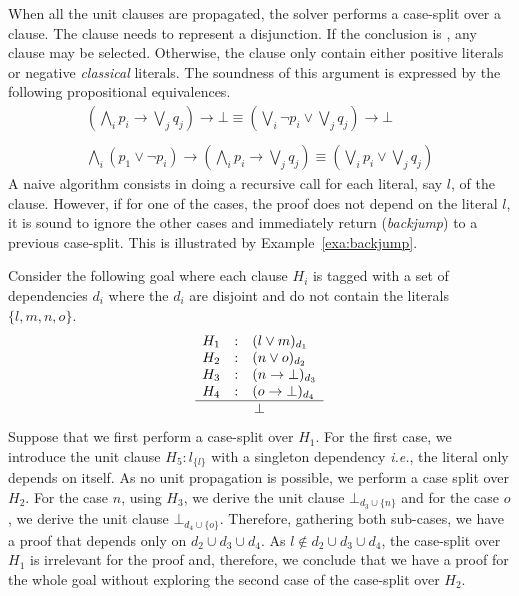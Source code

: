 \documentclass[a4paper,UKenglish,cleveref, autoref, thm-restate]{lipics-v2019}
\begin{document}
When all the unit clauses are propagated, the solver performs a
case-split over a clause. The clause needs to represent a
disjunction. If the conclusion is , any clause may be
selected. Otherwise, the clause only contain  either positive literals or  negative
\emph{classical} literals. The soundness of this argument is expressed by
the following propositional equivalences.
\[
  \begin{array}{l}
  (\bigwedge_i p_i \to \bigvee_j q_j) \to \bot \equiv (\bigvee_i \neg p_i \lor \bigvee_j q_j) \to \bot\\\\
    \bigwedge_i (p_1 \lor \neg p_i) \to (\bigwedge_i p_i \to \bigvee_j q_j) \equiv (\bigvee_i p_i \lor \bigvee_j q_j)
  \end{array}
\]
A naive algorithm consists in doing a recursive call for each literal,
say $l$, of the clause.  However, if for one of the cases, the proof
does not depend on the literal $l$, it is sound to ignore the other
cases and immediately return (\emph{backjump}) to a previous
case-split. This is illustrated by Example~\ref{exa:backjump}.
\begin{example}[Backjumping]
  \label{exa:backjump}
  Consider the following goal where each clause $H_i$ is tagged with a
  set of dependencies $d_i$ where the $d_i$ are disjoint and do not
  contain the literals $\{l,m,n,o\}$.
  \[
  \begin{array}{lcl}
    H_1 &:& (l \lor m)_{d_1}\\
    H_2 &:& (n \lor o)_{d_2}\\
    H_3 &:& (n \to \bot)_{d_3}\\
    H_4 &:& (o \to \bot)_{d_4}\\
    \hline
    \multicolumn{3}{c}{\bot}
  \end{array}
\]
Suppose that we first perform a case-split over $H_1$.  For the first
case, we introduce the unit clause $H_5:l_{\{l\}}$ with a singleton
dependency \emph{i.e.}, the literal only depends on itself. As no unit
propagation is possible, we perform a case split over $H_2$.  For the
case $n$, using $H_3$, we derive the unit clause
$\bot_{d_3 \cup \{n\}}$ and for the case $o$, we derive the unit
clause $\bot_{d_4 \cup \{o\}}$. Therefore, gathering both sub-cases,
we have a proof that depends only on $d_2 \cup d_3 \cup d_4$.  As
$l \notin d_2 \cup d_3 \cup d_4$, the case-split over $H_1$ is
irrelevant for the proof and, therefore, we conclude that we have a
proof for the whole goal without exploring the second case of the
case-split over $H_2$.
\end{example}
\end{document}
